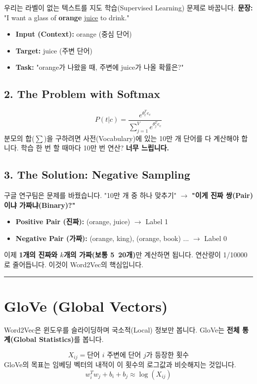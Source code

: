 \documentclass[11pt,a4paper]{book}
\theoremstyle{definition}
\begin{document}
우리는 라벨이 없는 텍스트를 지도 학습(Supervised Learning) 문제로 바꿉니다.
\textbf{문장:} "I want a glass of \textbf{orange} \underline{juice} to drink."
\begin{itemize}
    \item \textbf{Input (Context):} orange (중심 단어)
    \item \textbf{Target:} juice (주변 단어)
    \item \textbf{Task:} "orange가 나왔을 때, 주변에 juice가 나올 확률은?"
\end{itemize}

\subsection{2. The Problem with Softmax}
$$ P(t | c) = \frac{e^{\theta_t^T e_c}}{\sum_{j=1}^{V} e^{\theta_j^T e_c}} $$
분모의 합($\sum$)을 구하려면 사전(Vocabulary)에 있는 10만 개 단어를 다 계산해야 합니다. 학습 한 번 할 때마다 10만 번 연산? \textbf{너무 느립니다.}

\subsection{3. The Solution: Negative Sampling}
구글 연구팀은 문제를 바꿨습니다. "10만 개 중 하나 맞추기" $\rightarrow$ \textbf{"이게 진짜 쌍(Pair)이냐 가짜냐(Binary)?"}

\begin{itemize}
    \item \textbf{Positive Pair (진짜):} (orange, juice) $\rightarrow$ Label 1
    \item \textbf{Negative Pair (가짜):} (orange, king), (orange, book) ... $\rightarrow$ Label 0
\end{itemize}
이제 \textbf{1개의 진짜와 $k$개의 가짜(보통 5~20개)}만 계산하면 됩니다. 연산량이 1/10000로 줄어듭니다. 이것이 Word2Vec의 핵심입니다.

\vspace{0.5cm}\hrule\vspace{0.5cm}

\section{GloVe (Global Vectors)}

Word2Vec은 윈도우를 슬라이딩하며 국소적(Local) 정보만 봅니다. GloVe는 \textbf{전체 통계(Global Statistics)}를 봅니다.

\begin{formulabox}[title={Co-occurrence Matrix (동시 등장 행렬)}]
$$ X_{ij} = \text{단어 } i \text{ 주변에 단어 } j \text{가 등장한 횟수} $$
GloVe의 목표는 임베딩 벡터의 내적이 이 횟수의 로그값과 비슷해지는 것입니다.
$$ w_i^T w_j + b_i + b_j \approx \log(X_{ij}) $$
\end{formulabox}
\end{document}
